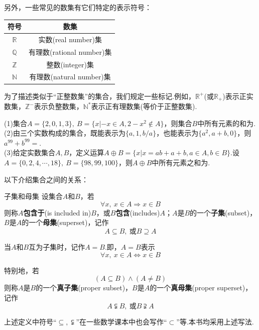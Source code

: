 \documentclass[lang=cn, zihao=4.5]{elegantbook}
\newcommand{\R}{\mathbb{R}}
\newcommand{\tk}{\uline{\hspace{4em}}}
\begin{document}
另外，一些常见的数集有它们特定的表示符号：

\begin{table}[h]
	\centering
	\renewcommand\arraystretch{1.3}
	\begin{tabular}{cc}
		\toprule
		符号           & 数集                    \\
		\midrule
		$\R$         & 实数(real number)集      \\
		$\mathbb{Q}$ & 有理数(rational number)集 \\
		$\mathbb{Z}$ & 整数(integer)集          \\
		$\mathbb{N}$ & 有理数(natural number)集 \\
		\bottomrule
	\end{tabular}
\end{table}

为了描述类似于“正整数集”的集合，我们规定一些标记.例如，$\R ^{+}$(或$\R _{+}$)表示正实数集，$\mathbb{Z}^{-}$表示负整数集，$\mathbb{N}^{*}$表示正有理数集(等价于正整数集).

\begin{example}
	(1)集合$A=\{ 2,0,1,3 \},~B = \{ x|-x \in A,2-x^2 \notin A \}$，则集合$B$中所有元素的和为\tk . \\
	(2)由三个实数构成的集合，既能表示为$\{ a,1,b/a \}$，也能表示为$\{ a^2,a+b,0 \}$，则$a^{99}+b^{99}=$\tk . \\
	(3)给定实数集合$A,B$，定义运算$A \oplus B = \{ x|x=ab+a+b,a \in A,b \in B \}$.设$A = \{ 0,2,4,\cdots ,18 \},~B= \{ 98,99,100 \}$，则$A \oplus B$中所有元素之和为\tk .
\end{example}
\begin{solution}
\end{solution}

以下介绍集合之间的关系：

\begin{definition}{子集和母集}
	设集合$A$和$B$，若$$\forall x,~x \in A \Rightarrow x \in B$$则称$A$\textbf{包含于}(is included in)$B$，或$B$\textbf{包含}(includes)$A$；$A$是$B$的一个\textbf{子集}(subset)，$B$是$A$的一个\textbf{母集}(superset)，记作$$A \subseteq B,~ \text{或} B \supseteq A$$
	
	当$A$和$B$互为子集时，记作$A=B$.即，$A=B$表示$$\forall x,~ x \in A \Leftrightarrow x \in B$$
	
	特别地，若$$(A \subseteq B) \wedge (A \neq B)$$则称$A$是$B$的一个\textbf{真子集}(proper subset)，$B$是$A$的一个\textbf{真母集}(proper superset)，记作$$A \subsetneqq B,~ \text{或} B \supsetneqq A$$
\end{definition}
\begin{note}
	上述定义中符号“$\subseteq ,\subsetneqq$”在一些数学课本中也会写作“$\subset$”等.本书均采用上述写法.
\end{note}
\end{document}

